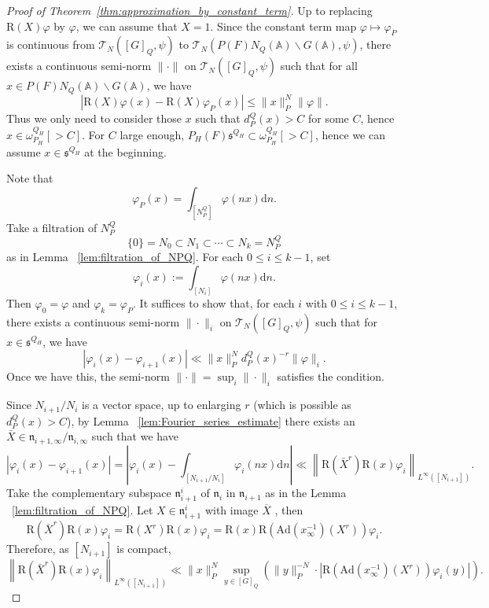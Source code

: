 \documentclass[letterpaper,11pt]{amsart}
\newcommand{\fn}{\mathfrak{n}}
\newcommand{\fs}{\mathfrak{s}}
\newcommand{\bA}{\mathbb{A}}
\newcommand{\cT}{\mathcal{T}}
\newcommand{\rd}{\mathrm{d}}
\newcommand{\<}{\negthickspace}
\newcommand{\valP}[1]{\left|#1\right|}
\theoremstyle{definition}
\theoremstyle{plain}
\theoremstyle{remark}
\numberwithin{equation}{section}
\begin{document}
\begin{proof}[Proof of Theorem~\ref{thm:approximation_by_constant_term}]
Up to replacing $\mathrm{R}(X)\varphi$ by $\varphi$, we can assume that $X=1$. Since
the constant term map $\varphi \mapsto \varphi_P$ is continuous from $\cT_N([G]_{Q},\psi)$ to
$\cT_N(P(F)N_Q(\bA) \backslash G(\bA),\psi)$, there exists a continuous semi-norm $\| \cdot \|$ on
$\cT_N([G]_Q,\psi)$ such that for all $x \in P(F)N_Q(\bA) \backslash G(\bA)$, we have
    \[
    \left| \mathrm{R}(X)\varphi(x)-\mathrm{R}(X)\varphi_P(x) \right| \le
    \|x\|_P^N \| \varphi \|.
    \]
Thus we only need to consider those $x$ such that $d_P^Q(x)>C$ for some $C$,
hence $x \in \omega_{P_H}^{Q_H}[>C]$. For $C$ large enough, $P_H(F) \fs^{Q_H}
\subset \omega_{P_H}^{Q_H}[>C]$, hence we can assume $x \in \fs^{Q_H}$ at the
beginning.

Note that
    \[
    \varphi_P(x) = \int_{[N_P^Q]} \varphi(nx) \rd n.
    \]
Take a filtration of $N_P^Q$
    \[
    \{0\} = N_0 \subset N_1 \subset \cdots \subset N_k=N_P^Q
    \]
as in Lemma ~\ref{lem:filtration_of_NPQ}. For each $0 \le i \le k-1$, set
    \[
    \varphi_i(x) := \int_{[N_i]} \varphi(nx) \rd n.
    \]
Then $\varphi_0=\varphi$ and $\varphi_k=\varphi_P$. It suffices
to show that, for each $i$ with $0 \le i \le k-1$, there exists a continuous
semi-norm $\| \cdot \|_i$ on $\cT_N([G]_Q,\psi)$ such that for $x \in \fs^{Q_H}$,
we have
    \[
    \left| \varphi_i(x) - \varphi_{i+1}(x) \right| \ll
    \|x\|_P^N d_P^Q(x)^{-r} \| \varphi \|_i.
    \]
Once we have this, the semi-norm $\| \cdot\| = \sup_i \| \cdot \|_i$ satisfies the condition.

Since $N_{i+1}/N_i$ is a vector space, up to enlarging $r$ (which is possible as $d_P^Q(x) >C$), by Lemma
~\ref{lem:Fourier_series_estimate} there exists an $\bar{X} \in
\fn_{i+1,\infty}/\fn_{i,\infty}$ such that we have
    \begin{equation} \label{eq:phi_i-phi_i+1}
    \left| \varphi_i(x) - \varphi_{i+1}(x) \right| =
    \left| \varphi_i(x) - \int_{[N_{i+1}/N_i]} \varphi_{i}(nx) \rd n \right|
    \ll \left\| \mathrm{R}(\bar{X}^r)
    \mathrm{R}(x) \varphi_i \right\|_{L^\infty([N_{i+1}])}.
    \end{equation}
Take the complementary subspace $\fn_{i+1}^{i}$ of $\fn_i$ in $\fn_{i+1}$ as
in the Lemma ~\ref{lem:filtration_of_NPQ}. Let $X \in \fn_{i+1}^i$ with image
$\overline{X}$ , then
    \[
    \mathrm{R}(\overline{X}^r) \mathrm{R}(x) \varphi_i =
    \mathrm{R}(X^r) \mathrm{R}(x) \varphi_i =
    \mathrm{R}(x) \mathrm{R}\left( \mathrm{Ad}(x_\infty^{-1})(X^r)\right)
    \varphi_i.
    \]
Therefore, as $[N_{i+1}]$ is compact,
    \begin{equation} \label{eq:approx_constant_term_adjoint}
    \left\| \mathrm{R}(\bar{X}^r) \mathrm{R}(x) \varphi_i \right\|_{L^\infty([N_{i+1}])}
    \ll \|x\|_P^N \sup_{y \in [G]_Q} \left( \|y\|_P^{-N} \cdot \valP{\mathrm{R}\left( \mathrm{Ad}(x_\infty^{-1})(X^r)\right)
    \varphi_i(y) }\right).
    \end{equation}


\end{proof}
\end{document}
